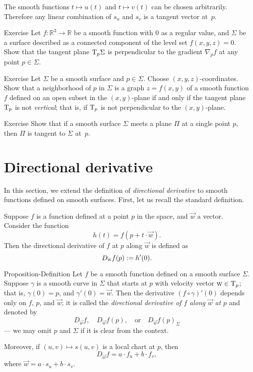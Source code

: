 The smooth functions $t\mapsto u(t)$ and $t\mapsto v(t)$ can be chosen arbitrarily.
Therefore any linear combination of $s_u$ and $s_v$ is a tangent vector at~$p$. 
\qeds


\begin{thm}{Exercise}\label{ex:tangent-normal}
Let $f:\mathbb{R}^3\to\mathbb{R}$ be a smooth function with $0$ as a regular value, and $\Sigma$ be a surface described as a connected component of the level set $f(x,y,z)=0$.
Show that the tangent plane $\mathrm{T}_p\Sigma$ is perpendicular to the gradient $\nabla_pf$ at any point $p\in\Sigma$.
\end{thm}

\begin{thm}{Exercise}\label{ex:vertical-tangent}
Let $\Sigma$ be a smooth surface and $p\in\Sigma$.
Choose $(x,y,z)$-coordinates.
Show that a neighborhood of $p$ in $\Sigma$ is a graph $z=f(x,y)$ of a smooth function $f$ defined on an open subset in the $(x,y)$-plane if and only if the tangent plane $\mathrm{T}_p$ is not {}\emph{vertical}; that is, if $\mathrm{T}_p$ is not perpendicular to the $(x,y)$-plane.
\end{thm}

\begin{thm}{Exercise}\label{ex:tangent-single-point}
Show that if a smooth surface $\Sigma$ meets a plane $\Pi$ at a single point $p$, then $\Pi$ is tangent to $\Sigma$ at~$p$.
\end{thm}


\section{Directional derivative}\label{sec:dirder}

In this section, we extend the definition of {}\emph{directional derivative} to smooth functions defined on smooth surfaces.
First, let us recall the standard definition.

Suppose $f$ is a function defined at a point $p$ in the space, and $\vec w$ a vector.
Consider the function
\[h(t)=f(p+t\cdot\vec w).\]
Then the directional derivative of $f$ at $p$ along $\vec w$ is defined as 
\[D_{\text{\sc{w}}}f(p)\mathrel{:=} h'(0).\]

\begin{thm}{Proposition-Definition}\label{def:directional-derivative}
Let $f$ be a smooth function defined on a smooth surface $\Sigma$.
Suppose $\gamma$ is a smooth curve in $\Sigma$ that starts at $p$ with velocity vector $\text{\sc{w}}\in \mathrm{T}_p$;
that is, $\gamma(0)=p$, and $\gamma'(0)=\vec{w}$.
Then the derivative $(f\circ\gamma)'(0)$
depends only on $f$, $p$, and $\vec{w}$;
it is called the \emph{directional derivative of $f$ along $\vec{w}$ at $p$}
and denoted by
\[D_{\vec{w}}f,\quad D_{\vec{w}}f(p), \quad\text{or}\quad D_{\vec{w}}f(p)_\Sigma\] 
--- we may omit $p$ and $\Sigma$ if it is clear from the context.

Moreover, if $(u,v)\mapsto s(u,v)$ is a local chart at $p$, then 
\[D_{\vec{w}}f=a\cdot f_u+b\cdot f_v,\]
where $\vec{w}=a\cdot s_u +b\cdot s_v$. 
\end{thm}

